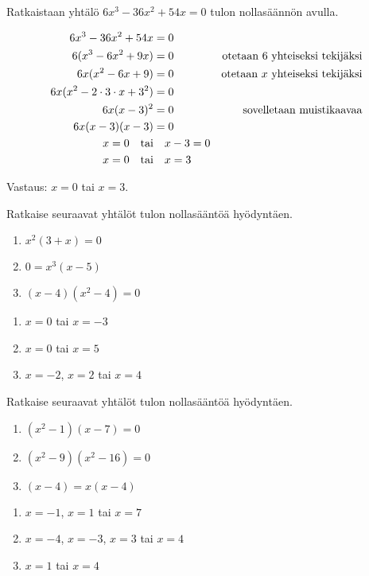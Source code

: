\begin{esimerkki}
Ratkaistaan yhtälö $6x^3-36x^2+54x=0$ tulon nollasäännön avulla.

\begin{align*}
6x^3-36x^2+54x &= 0 \\
6(x^3-6x^2+9x) &= 0 \ \ \ \ &\text{otetaan } 6 \text{ yhteiseksi tekijäksi} \\
6x(x^2-6x+9) &= 0 &\text{otetaan } x \text{ yhteiseksi tekijäksi} \\
6x(x^2-2\cdot 3\cdot x+3^2)  &= 0 \\
6x(x-3)^2 &= 0 &\text{sovelletaan muistikaavaa} \\
6x(x-3)(x-3) &= 0 \\
x=0 \textrm{\quad tai}& \quad x-3=0 \\
x=0 \textrm{\quad tai}& \quad x=3
\end{align*}

Vastaus: $x=0$ tai $x=3$.
\end{esimerkki}

\Harjoitustehtavat

\begin{tehtava}
    Ratkaise seuraavat yhtälöt tulon nollasääntöä hyödyntäen.
    \begin{enumerate}
        \item $x^2(3+x)=0$
        \item $0=x^3(x-5)$
        \item $(x-4)(x^2-4)=0$
    \end{enumerate}
    \begin{vastaus}
        \begin{enumerate}
            \item $x=0$ tai $x=-3$
            \item $x=0$ tai $x=5$
            \item $x=-2$, $x=2$ tai $x=4$
        \end{enumerate}
    \end{vastaus}
\end{tehtava}

\begin{tehtava}
    Ratkaise seuraavat yhtälöt tulon nollasääntöä hyödyntäen.
    \begin{enumerate}
        \item $(x^2-1)(x-7)=0$
        \item $(x^2-9)(x^2-16)=0$
        \item $(x-4)=x(x-4)$
    \end{enumerate}
    \begin{vastaus}
        \begin{enumerate}
            \item $x=-1$, $x=1$ tai $x=7$
            \item $x=-4$, $x=-3$, $x=3$ tai $x=4$
            \item $x=1$ tai $x=4$
        \end{enumerate}
    \end{vastaus}
\end{tehtava}


